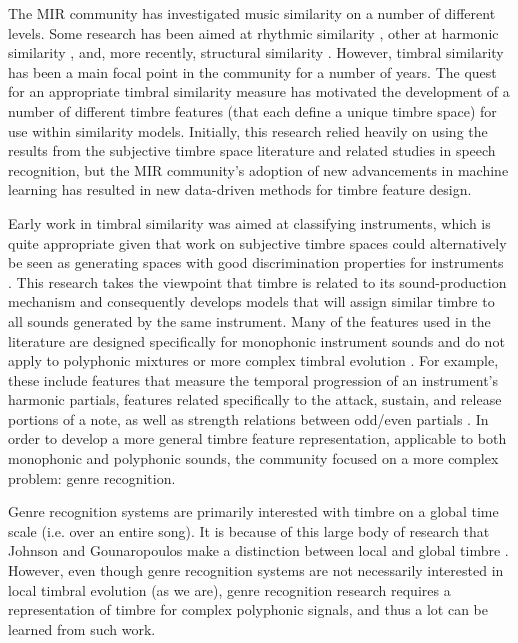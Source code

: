 \documentclass[12pt]{report} 	%
\numberwithin{figure}{chapter}
\numberwithin{table}{chapter}
\numberwithin{equation}{chapter}
\begin{document}
\begin{flushleft}
The MIR community has investigated music similarity on a number of different levels. Some research has been aimed at rhythmic similarity \cite{Paulus:2002ec}, other at harmonic similarity \cite{Haas:2009mw}, and, more recently, structural similarity \cite{Bello:NoRead}. However, timbral similarity has been a main focal point in the community for a number of years. The quest for an appropriate timbral similarity measure has motivated the development of a number of different timbre features (that each define a unique timbre space) for use within similarity models. Initially, this research relied heavily on using the results from the subjective timbre space literature and related studies in speech recognition, but the MIR community's adoption of new advancements in machine learning has resulted in new data-driven methods for timbre feature design.

Early work in timbral similarity was aimed at classifying instruments, which is quite appropriate given that work on subjective timbre spaces could alternatively be seen as generating spaces with good discrimination properties for instruments \cite{Loureiro:2000wq, Park:2004fv, Timoney:2004ff, Zhang:2006jo}. This research takes the viewpoint that timbre is related to its sound-production mechanism and consequently develops models that will assign similar timbre to all sounds generated by the same instrument. Many of the features used in the literature are designed specifically for monophonic instrument sounds and do not apply to polyphonic mixtures or more complex timbral evolution \cite[p. 6]{Ciglar:2009uf}. For example, these include features that measure the temporal progression of an instrument's harmonic partials, features related specifically to the attack, sustain, and release portions of a note, as well as strength relations between odd/even partials \cite[p. 182]{Timoney:2004ff}. In order to develop a more general timbre feature representation, applicable to both monophonic and polyphonic sounds, the community focused on a more complex problem: genre recognition.

Genre recognition systems are primarily interested with timbre on a global time scale (i.e. over an entire song). It is because of this large body of research that Johnson and Gounaropoulos make a distinction between local and global timbre \cite{Johnson:2006pi}. However, even though genre recognition systems are not necessarily interested in local timbral evolution (as we are), genre recognition research requires a representation of timbre for complex polyphonic signals, and thus a lot can be learned from such work.


\end{flushleft}
\end{document}
